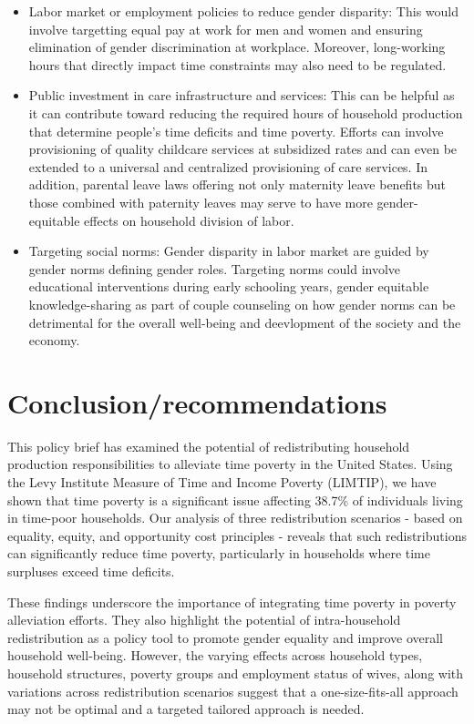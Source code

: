 \documentclass[
  11pt,
]{article}
\providecommand{\tightlist}{%
  \setlength{\itemsep}{0pt}\setlength{\parskip}{0pt}}\usepackage{longtable,booktabs,array}
\begin{document}
\begin{itemize}
\tightlist
\item
  Labor market or employment policies to reduce gender disparity: This
  would involve targetting equal pay at work for men and women and
  ensuring elimination of gender discrimination at workplace. Moreover,
  long-working hours that directly impact time constraints may also need
  to be regulated.
\item
  Public investment in care infrastructure and services: This can be
  helpful as it can contribute toward reducing the required hours of
  household production that determine people's time deficits and time
  poverty. Efforts can involve provisioning of quality childcare
  services at subsidized rates and can even be extended to a universal
  and centralized provisioning of care services. In addition, parental
  leave laws offering not only maternity leave benefits but those
  combined with paternity leaves may serve to have more gender-equitable
  effects on household division of labor.
\item
  Targeting social norms: Gender disparity in labor market are guided by
  gender norms defining gender roles. Targeting norms could involve
  educational interventions during early schooling years, gender
  equitable knowledge-sharing as part of couple counseling on how gender
  norms can be detrimental for the overall well-being and deevlopment of
  the society and the economy.
\end{itemize}

\section{Conclusion/recommendations}\label{conclusionrecommendations}

This policy brief has examined the potential of redistributing household
production responsibilities to alleviate time poverty in the United
States. Using the Levy Institute Measure of Time and Income Poverty
(LIMTIP), we have shown that time poverty is a significant issue
affecting 38.7\% of individuals living in time-poor households. Our
analysis of three redistribution scenarios - based on equality, equity,
and opportunity cost principles - reveals that such redistributions can
significantly reduce time poverty, particularly in households where time
surpluses exceed time deficits.

These findings underscore the importance of integrating time poverty in
poverty alleviation efforts. They also highlight the potential of
intra-household redistribution as a policy tool to promote gender
equality and improve overall household well-being. However, the varying
effects across household types, household structures, poverty groups and
employment status of wives, along with variations across redistribution
scenarios suggest that a one-size-fits-all approach may not be optimal
and a targeted tailored approach is needed.
\end{document}
